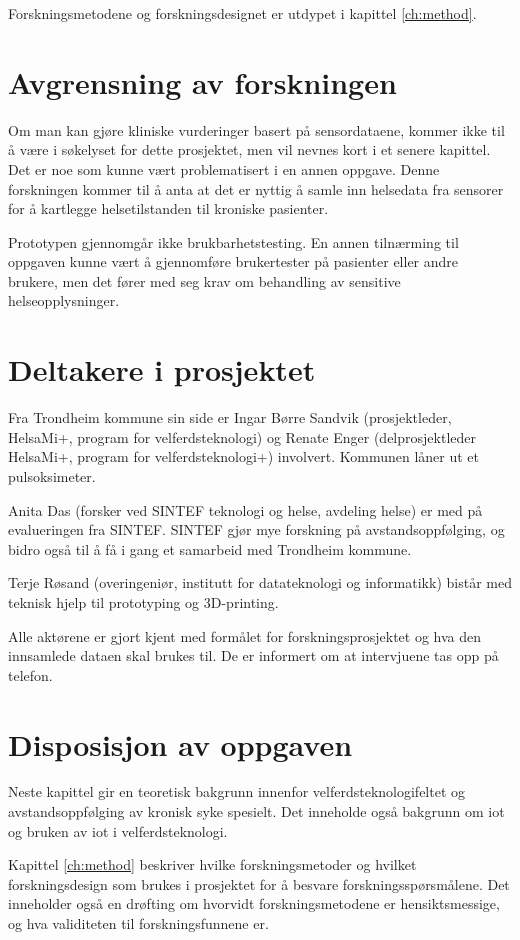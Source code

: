 Forskningsmetodene og forskningsdesignet er utdypet i kapittel \ref{ch:method}.

\section{Avgrensning av forskningen}
Om man kan gjøre kliniske vurderinger basert på sensordataene, kommer ikke til å være i søkelyset for dette prosjektet,
men vil nevnes kort i et senere kapittel. Det er noe som kunne vært problematisert i en annen oppgave.
Denne forskningen kommer til å anta at det er nyttig å samle inn helsedata fra sensorer for å kartlegge helsetilstanden til kroniske pasienter.

Prototypen gjennomgår ikke brukbarhetstesting. En annen tilnærming til oppgaven kunne vært å gjennomføre brukertester på pasienter eller andre brukere, men det
fører med seg krav om behandling av sensitive helseopplysninger. 

\section{Deltakere i prosjektet}
Fra Trondheim kommune sin side er Ingar Børre Sandvik (prosjektleder, HelsaMi+, program for velferdsteknologi) og Renate Enger
(delprosjektleder HelsaMi+, program for velferdsteknologi+) involvert. Kommunen låner ut et pulsoksimeter.

Anita Das (forsker ved SINTEF teknologi og helse, avdeling helse) er med på evalueringen fra SINTEF. SINTEF gjør mye forskning på
avstandsoppfølging, og bidro også til å få i gang et samarbeid med Trondheim kommune.

Terje Røsand (overingeniør, institutt for datateknologi og informatikk) bistår med teknisk hjelp til prototyping og 3D-printing.

Alle aktørene er gjort kjent med formålet for forskningsprosjektet og hva den innsamlede dataen skal brukes til. De er informert om at
intervjuene tas opp på telefon.

\section{Disposisjon av oppgaven}
Neste kapittel gir en teoretisk bakgrunn innenfor velferdsteknologifeltet og avstandsoppfølging av kronisk syke spesielt.
Det inneholde også bakgrunn om \gls{iot} og bruken av \gls{iot} i velferdsteknologi.

Kapittel \ref{ch:method} beskriver hvilke forskningsmetoder og hvilket forskningsdesign som brukes i prosjektet for å besvare forskningsspørsmålene. 
Det inneholder også en drøfting om hvorvidt forskningsmetodene er hensiktsmessige, og hva validiteten til forskningsfunnene er.

